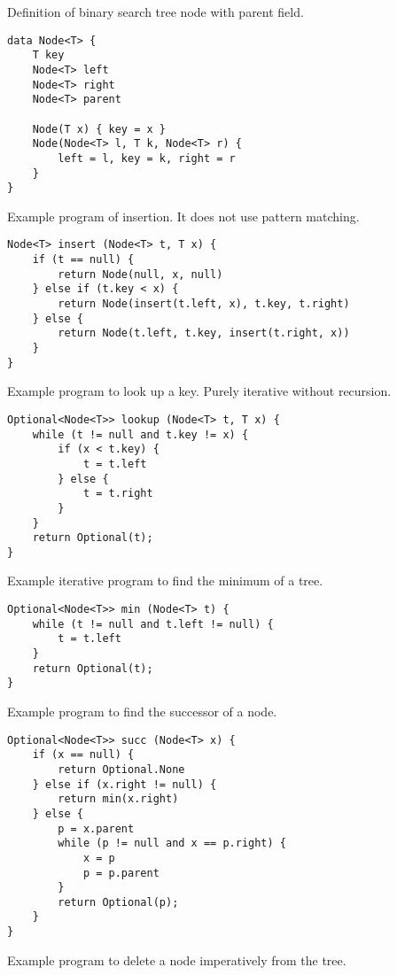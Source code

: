 \documentclass[b5paper]{article}
\begin{document}
Definition of binary search tree node with parent field.

\lstset{language=Bourbaki, frame=single}
\begin{lstlisting}
data Node<T> {
    T key
    Node<T> left
    Node<T> right
    Node<T> parent

    Node(T x) { key = x }
    Node(Node<T> l, T k, Node<T> r) {
        left = l, key = k, right = r
    }
}
\end{lstlisting}

Example program of insertion. It does not use pattern matching.

\begin{lstlisting}
Node<T> insert (Node<T> t, T x) {
    if (t == null) {
        return Node(null, x, null)
    } else if (t.key < x) {
        return Node(insert(t.left, x), t.key, t.right)
    } else {
        return Node(t.left, t.key, insert(t.right, x))
    }
}
\end{lstlisting}

Example program to look up a key. Purely iterative without recursion.

\begin{lstlisting}
Optional<Node<T>> lookup (Node<T> t, T x) {
    while (t != null and t.key != x) {
        if (x < t.key) {
            t = t.left
        } else {
            t = t.right
        }
    }
    return Optional(t);
}
\end{lstlisting}

Example iterative program to find the minimum of a tree.

\begin{lstlisting}
Optional<Node<T>> min (Node<T> t) {
    while (t != null and t.left != null) {
        t = t.left
    }
    return Optional(t);
}
\end{lstlisting}

Example program to find the successor of a node.
\begin{lstlisting}
Optional<Node<T>> succ (Node<T> x) {
    if (x == null) {
        return Optional.None
    } else if (x.right != null) {
        return min(x.right)
    } else {
        p = x.parent
        while (p != null and x == p.right) {
            x = p
            p = p.parent
        }
        return Optional(p);
    }
}
\end{lstlisting}

Example program to delete a node imperatively from the tree.
\end{document}
